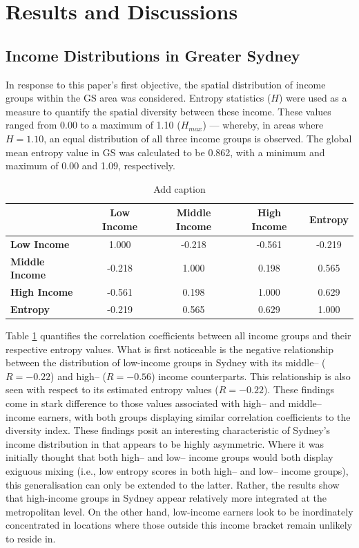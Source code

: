 \section{Results and Discussions}
\label{sec:results}

\subsection{Income Distributions in Greater Sydney}

In response to this paper's first objective, the spatial distribution of income groups within the GS area was considered. Entropy statistics ($H$) were used as a measure to quantify the spatial diversity between these income. These values ranged from 0.00 to a maximum of 1.10 ($H_{max}$) --- whereby, in areas where $H = 1.10$, an equal distribution of all three income groups is observed. The global mean entropy value in GS was calculated to be 0.862, with a minimum and maximum of 0.00 and 1.09, respectively. \\

\renewcommand{\baselinestretch}{0.8}
\begin{table}[!ht]
  \centering \small
    \begin{tabular}{l|cccc}
          & \textbf{Low Income} & \textbf{Middle Income} & \textbf{High Income} & \textbf{Entropy} \\
    \midrule
    \textbf{Low Income} & 1.000 & -0.218 & -0.561 & -0.219 \\
    \textbf{Middle Income} & -0.218 & 1.000 & 0.198 & 0.565 \\
    \textbf{High Income} & -0.561 & 0.198 & 1.000 & 0.629 \\
    \textbf{Entropy} & -0.219 & 0.565 & 0.629 & 1.000 \\
    \end{tabular}%
      \caption{Add caption}
  \label{tab:entropy_incomes}%
\end{table}%

Table \ref{tab:entropy_incomes} quantifies the correlation coefficients between all income groups and their respective entropy values. What is first noticeable is the negative relationship between the distribution of low-income groups in Sydney with its middle-- ($R=-0.22$) and high-- ($R=-0.56$) income counterparts. This relationship is also seen with respect to its estimated entropy values ($R=-0.22$). These findings come in stark difference to those values associated with high-- and middle-- income earners, with both groups displaying similar correlation coefficients to the diversity index. These findings posit an interesting characteristic of Sydney's income distribution in that appears to be highly asymmetric. Where it was initially thought that both high-- and low-- income groups would both display exiguous mixing (i.e., low entropy scores in both high-- and low-- income groups), this generalisation can only be extended to the latter. Rather, the results show that high-income groups in Sydney appear relatively more integrated at the metropolitan level. On the other hand, low-income earners look to be inordinately concentrated in locations where those outside this income bracket remain unlikely to reside in. \\

